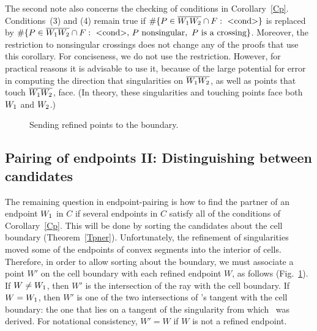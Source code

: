 The second note also concerns the checking of conditions in Corollary~\ref{Cp}.
Conditions~(3) and (4) remain true 
if $\#\{P \in \seg{W_{1}W_{2}} \cap F:\ \mbox{$<$cond$>$} \}$ 
is replaced by $\#\{P \in \seg{W_{1}W_{2}} \cap F:\ \mbox{$<$cond$>$},\,
P \mbox{ nonsingular},\ P \mbox{ is a crossing}\}$.  
Moreover, the restriction to nonsingular crossings does not change any of the 
proofs that
use this corollary.
For conciseness, we do not use the restriction.
However, for practical reasons it is advisable to use it,
because of the large potential for error in computing the direction that
singularities on $\mbox{$\overline{\mbox{$W_{1}$}\mbox{$W_{2}$}}$}$, as well as points that touch $\mbox{$\overline{\mbox{$W_{1}$}\mbox{$W_{2}$}}$}$, face.
(In theory, these singularities and touching points face both $\mbox{$W_{1}$}$ and $\mbox{$W_{2}$}$.)

\begin{figure}[htbp]\vspace{3.5in}\caption{Sending refined points 
to the boundary.}\label{3.J}\end{figure}

\subsection{Pairing of endpoints II: Distinguishing between candidates}
\label{sspII}

The remaining question in endpoint-pairing is how to find the partner 
of an endpoint $\mbox{$W_{1}$}$ in $C$ if several endpoints in $C$ satisfy all of the 
conditions of Corollary~\ref{Cp}.  
This will be done by sorting the candidates about the cell boundary
(Theorem~\ref{Tpner}).
Unfortunately, the refinement of singularities moved some of the endpoints 
of convex segments into the interior of cells.  
Therefore, in order to allow sorting about the boundary, we must associate 
a point $W'$ on the cell boundary with each refined endpoint $W$, as follows
(Fig.~\ref{3.J}).
If $W \neq \mbox{$W_{1}$}$,  then $W'$ is the intersection of the ray  
with the cell boundary.
%
%
If $W = \mbox{$W_{1}$}$, then $W'$ is one of the two intersections of \wo's tangent with
the cell boundary: the one that lies on a tangent of the singularity
from which \wo\ was derived.
For notational consistency, $W' = W$ if $W$ is not a refined endpoint.

